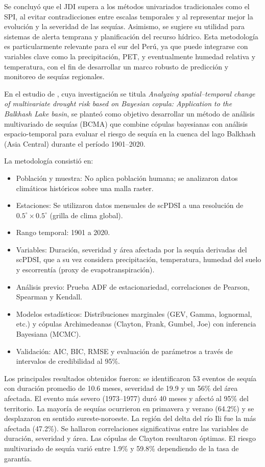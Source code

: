 Se concluyó que el JDI supera a los métodos univariados tradicionales como el SPI, al evitar contradicciones entre escalas temporales y al representar mejor la evolución y la severidad de las sequías. Asimismo, se sugiere su utilidad para sistemas de alerta temprana y planificación del recurso hídrico. Esta metodología es particularmente relevante para el sur del Perú, ya que puede integrarse con variables clave como la precipitación, PET, y eventualmente humedad relativa y temperatura, con el fin de desarrollar un marco robusto de predicción y monitoreo de sequías regionales.

En el estudio de \textcite{Yang2022}, cuya investigación se titula \textit{Analyzing spatial–temporal change of multivariate drought risk based on Bayesian copula: Application to the Balkhash Lake basin}, se planteó como objetivo desarrollar un método de análisis multivariado de sequías (BCMA) que combine cópulas bayesianas con análisis espacio-temporal para evaluar el riesgo de sequía en la cuenca del lago Balkhash (Asia Central) durante el período 1901–2020.

La metodología consistió en:
\begin{itemize}
    \item Población y muestra: No aplica población humana; se analizaron datos climáticos históricos sobre una malla raster.
    \item Estaciones: Se utilizaron datos mensuales de scPDSI a una resolución de $0.5^\circ \times 0.5^\circ$ (grilla de clima global).
    \item Rango temporal: 1901 a 2020.
    \item Variables: Duración, severidad y área afectada por la sequía derivadas del scPDSI, que a su vez considera precipitación, temperatura, humedad del suelo y escorrentía (proxy de evapotranspiración).
    \item Análisis previo: Prueba ADF de estacionariedad, correlaciones de Pearson, Spearman y Kendall.
    \item Modelos estadísticos: Distribuciones marginales (GEV, Gamma, lognormal, etc.) y cópulas Archimedeanas (Clayton, Frank, Gumbel, Joe) con inferencia Bayesiana (MCMC).
    \item Validación: AIC, BIC, RMSE y evaluación de parámetros a través de intervalos de credibilidad al 95\%.
\end{itemize}

Los principales resultados obtenidos fueron: se identificaron 53 eventos de sequía con duración promedio de 10.6 meses, severidad de 19.9 y un 56\% del área afectada. El evento más severo (1973–1977) duró 40 meses y afectó al 95\% del territorio. La mayoría de sequías ocurrieron en primavera y verano (64.2\%) y se desplazaron en sentido sureste-noroeste. La región del delta del río Ili fue la más afectada (47.2\%). Se hallaron correlaciones significativas entre las variables de duración, severidad y área. Las cópulas de Clayton resultaron óptimas. El riesgo multivariado de sequía varió entre 1.9\% y 59.8\% dependiendo de la tasa de garantía.

